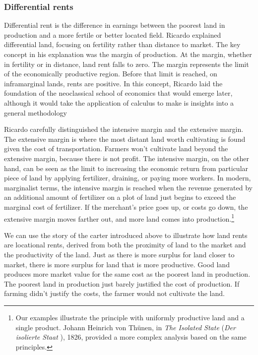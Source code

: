 
\subsubsection{Differential rents}

Differential rent is the difference in earnings between the poorest land in production and a more fertile or better located field. Ricardo explained  differential land, focusing on fertility rather than distance to market. 
The key concept in his explanation was the margin of production. 
At the \gls{margin}, whether in fertility or in distance, land \gls{rent} falls to zero.  The margin represents the limit of the economically productive region.  
Before that limit is reached, on \gls{inframarginal} lands, rents are positive. In  this concept, Ricardo laid the foundation of the neoclassical school of economics that would emerge later, although it would take the application of calculus to make is insights into a general methodology 

Ricardo carefully distinguished the \gls{intensive margin} and the \gls{extensive margin}. The extensive margin is where the most distant land worth cultivating is found given the cost of transportation. Farmers won't cultivate land beyond the extensive margin, because there is not profit. The intensive margin, on the other hand, can be seen as the limit to increasing the economic return from  particular piece of land by applying fertilizer, draining, or paying more workers. In modern, \gls{marginalist} terms, the intensive margin is reached when the revenue generated by an additional amount of fertilizer on a plot of land just begins to exceed the marginal cost of fertilizer. If the merchant's price goes up, or costs go down, the \gls{extensive margin} moves farther out, and more land comes into production.\footnote{Our examples illustrate the principle with uniformly productive land and a single product. Johann Heinrich von Th\"unen, in \textit{The Isolated State} (\textit{Der isolierte Staat} \cite{vonthunenIsolirteStaatBeziehung1826}), 1826, provided a more complex analysis based on the same principles.}

We can use the story of the carter introduced above to illustrate how land rents are locational rents, derived from both the proximity of land to the market and the productivity of the land. Just as there is more surplus for land closer to market, there is more surplus for land that is more productive. Good land produces more market value for the same cost as the poorest land in production. The poorest land in production just barely justified the cost of production. If farming didn't justify the costs, the farmer would not cultivate the land. 

